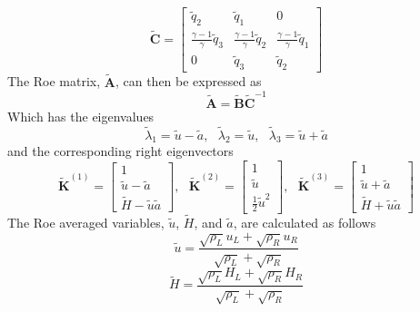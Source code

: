 \begin{equation}
	\tilde{\boldsymbol{C}} = \begin{bmatrix}
		\tilde{q}_2 & \tilde{q}_1 & 0\\
		\frac{\gamma-1}{\gamma}\tilde{q}_3 & \frac{\gamma-1}{\gamma}\tilde{q}_2 & \frac{\gamma-1}{\gamma}\tilde{q}_1\\
		0 & \tilde{q}_3 & \tilde{q}_2
	\end{bmatrix}
\end{equation}
The Roe matrix, $\tilde{\boldsymbol{A}}$, can then be expressed as
\begin{equation}
	\tilde{\boldsymbol{A}} = \tilde{\boldsymbol{B}} \tilde{\boldsymbol{C}}^{-1}
\end{equation}
Which has the eigenvalues
\begin{equation}
	\tilde{\lambda}_1 = \tilde{u} - \tilde{a},\,\,\,\,\tilde{\lambda}_2 = \tilde{u},\,\,\,\,\tilde{\lambda}_3 = \tilde{u} + \tilde{a}
\end{equation}
and the corresponding right eigenvectors
\begin{equation}\label{eq:eigenvectors}
	\tilde{\boldsymbol{K}}^{\left(1\right)} = \begin{bmatrix}
		1 \\ \tilde{u} - \tilde{a} \\ \tilde{H} - \tilde{u} \tilde{a}
	\end{bmatrix},\,\,\,\,
	\tilde{\boldsymbol{K}}^{\left(2\right)} = \begin{bmatrix}
		1 \\ \tilde{u} \\ \frac{1}{2} \tilde{u}^2
	\end{bmatrix},\,\,\,\,
	\tilde{\boldsymbol{K}}^{\left(3\right)} = \begin{bmatrix}
		1 \\ \tilde{u} + \tilde{a} \\ \tilde{H} + \tilde{u} \tilde{a}
	\end{bmatrix}
\end{equation}
The Roe averaged variables, $\tilde{u}$, $\tilde{H}$, and $\tilde{a}$, are calculated as follows
\begin{equation}
	\tilde{u} = \frac{\sqrt{\rho_L} u_L + \sqrt{\rho_R} u_R}{\sqrt{\rho_L} + \sqrt{\rho_R}}
\end{equation}
\begin{equation}
	\tilde{H} = \frac{\sqrt{\rho_L} H_L + \sqrt{\rho_R} H_R}{\sqrt{\rho_L} + \sqrt{\rho_R}}
\end{equation}
